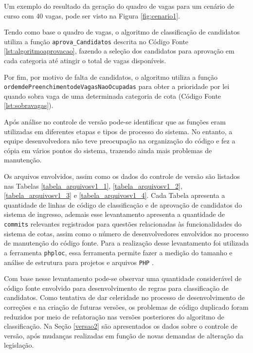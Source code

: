 Um exemplo do resultado da geração do quadro de vagas para um cenário de curso com 40 vagas,  pode ser visto na Figura \ref{fig:cenario1}.



\newpage
Tendo como base o quadro de vagas, o algoritmo de classificação de candidatos utiliza a função \texttt{aprova\_Candidatos} descrita no Código Fonte \ref{lst:algoritmoaprovacao}, fazendo a seleção dos candidatos para aprovação em cada categoria até atingir o total de vagas disponíveis. 



Por fim, por motivo de falta de candidatos, o algoritmo utiliza a função \newline \texttt{ordemdePreenchimentodeVagasNaoOcupadas} para obter a prioridade por lei quando sobra vaga de uma determinada categoria de cota (Código Fonte \ref{lst:sobravagas}).

\newpage


Após análise no controle de versão pode-se identificar que as funções eram utilizadas em diferentes etapas e tipos de processo do sistema. No entanto, a equipe desenvolvedora não teve preocupação na organização do código e fez a cópia em vários pontos do sistema, trazendo ainda mais problemas de manutenção. 

Os arquivos envolvidos, assim como os dados do controle de versão são listados nas Tabelas \ref{tabela_arquivosv1_1}, \ref{tabela_arquivosv1_2}, \ref{tabela_arquivosv1_3} e \ref{tabela_arquivosv1_4}. Cada Tabela apresenta a quantidade de linhas de código de classificação e de aprovação de candidatos do sistema de ingresso, ademais esse levantamento apresenta a quantidade de \texttt{commits} relevantes registrados para questões relacionadas às funcionalidades do sistema de cotas, assim como o número de desenvolvedores envolvidos no processo de manutenção do código fonte. Para a realização desse levantamento foi utilizada a ferramenta \texttt{phploc}, essa ferramenta permite fazer a medição do tamanho e análise de estrutura para projetos e arquivos \texttt{PHP} \cite{phplock}.



\newpage
Com base nesse levantamento pode-se observar uma quantidade considerável de código fonte envolvido para desenvolvimento de regras para classificação de candidatos. Como tentativa de dar celeridade no processo de desenvolvimento de correções e na criação de futuras versões, os problemas de código duplicado foram reduzidos por meio de refatoração nas versões posteriores do algoritmo de classificação. Na Seção \ref{versao2} são apresentados os dados sobre o controle de versão, após mudanças realizadas em função de novas demandas de alteração da legislação.

